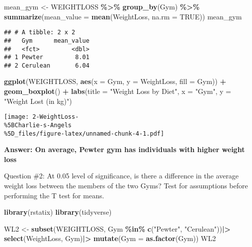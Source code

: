\documentclass[
]{article}
\newenvironment{Shaded}{\begin{snugshade}}{\end{snugshade}}
\newcommand{\AttributeTok}[1]{\textcolor[rgb]{0.13,0.29,0.53}{#1}}
\newcommand{\ConstantTok}[1]{\textcolor[rgb]{0.56,0.35,0.01}{#1}}
\newcommand{\FunctionTok}[1]{\textcolor[rgb]{0.13,0.29,0.53}{\textbf{#1}}}
\newcommand{\NormalTok}[1]{#1}
\newcommand{\OtherTok}[1]{\textcolor[rgb]{0.56,0.35,0.01}{#1}}
\newcommand{\SpecialCharTok}[1]{\textcolor[rgb]{0.81,0.36,0.00}{\textbf{#1}}}
\newcommand{\StringTok}[1]{\textcolor[rgb]{0.31,0.60,0.02}{#1}}
\begin{document}
\begin{Shaded}
\begin{Highlighting}[]
\NormalTok{mean\_gym }\OtherTok{\textless{}{-}}\NormalTok{ WEIGHTLOSS }\SpecialCharTok{\%\textgreater{}\%}
  \FunctionTok{group\_by}\NormalTok{(Gym) }\SpecialCharTok{\%\textgreater{}\%}
  \FunctionTok{summarize}\NormalTok{(}\AttributeTok{mean\_value =} \FunctionTok{mean}\NormalTok{(WeightLoss, }\AttributeTok{na.rm =} \ConstantTok{TRUE}\NormalTok{))}
\NormalTok{mean\_gym}
\end{Highlighting}
\end{Shaded}

\begin{verbatim}
## # A tibble: 2 x 2
##   Gym      mean_value
##   <fct>         <dbl>
## 1 Pewter         8.01
## 2 Cerulean       6.04
\end{verbatim}

\begin{Shaded}
\begin{Highlighting}[]
\FunctionTok{ggplot}\NormalTok{(WEIGHTLOSS, }\FunctionTok{aes}\NormalTok{(}\AttributeTok{x =}\NormalTok{ Gym, }\AttributeTok{y =}\NormalTok{ WeightLoss, }\AttributeTok{fill =}\NormalTok{ Gym)) }\SpecialCharTok{+}
  \FunctionTok{geom\_boxplot}\NormalTok{() }\SpecialCharTok{+}
  \FunctionTok{labs}\NormalTok{(}\AttributeTok{title =} \StringTok{"Weight Loss by Diet"}\NormalTok{, }\AttributeTok{x =} \StringTok{"Gym"}\NormalTok{, }\AttributeTok{y =} \StringTok{"Weight Lost (in kg)"}\NormalTok{)}
\end{Highlighting}
\end{Shaded}

\texttt{[image: 2-WeightLoss-\\\%5BCharlie-s-Angels\\\%5D\_files/figure-latex/unnamed-chunk-4-1.pdf]}

\textbf{Answer: On average, Pewter gym has individuals with higher
weight loss}

Question \#2: At 0.05 level of significance, is there a difference in
the average weight loss between the members of the two Gyms? Test for
assumptions before performing the T test for means.

\begin{Shaded}
\begin{Highlighting}[]
\FunctionTok{library}\NormalTok{(rstatix)}
\FunctionTok{library}\NormalTok{(tidyverse)}

\NormalTok{WL2 }\OtherTok{\textless{}{-}} \FunctionTok{subset}\NormalTok{(WEIGHTLOSS, Gym }\SpecialCharTok{\%in\%} \FunctionTok{c}\NormalTok{(}\StringTok{"Pewter"}\NormalTok{, }\StringTok{"Cerulean"}\NormalTok{))}\SpecialCharTok{|\textgreater{}}
  \FunctionTok{select}\NormalTok{(WeightLoss, Gym)}\SpecialCharTok{|\textgreater{}}
  \FunctionTok{mutate}\NormalTok{(}\AttributeTok{Gym =} \FunctionTok{as.factor}\NormalTok{(Gym))}
\NormalTok{WL2}
\end{Highlighting}
\end{Shaded}
\end{document}

